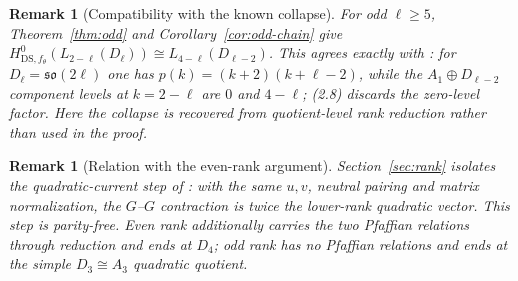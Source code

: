 \documentclass[11pt]{article}
\newtheorem{remark}[theorem]{Remark}
\begin{document}
\begin{remark}[Compatibility with the known collapse]
For odd $\ell\ge5$, Theorem~\ref{thm:odd} and
Corollary~\ref{cor:odd-chain} give
$H^0_{\mathrm{DS},f_\theta}(L_{2-\ell}(D_\ell))\cong
L_{4-\ell}(D_{\ell-2})$.  This agrees exactly with
\cite[Theorem~2.3, Table~4, (2.6), and (2.8)]{AKMPP}: for
$D_\ell=\mathfrak{so}(2\ell)$ one has
$p(k)=(k+2)(k+\ell-2)$, while the $A_1\oplus D_{\ell-2}$ component
levels at $k=2-\ell$ are $0$ and $4-\ell$; (2.8) discards the zero-level
factor.  Here the collapse is recovered from quotient-level rank reduction
rather than used in the proof.
\end{remark}

\begin{remark}[Relation with the even-rank argument]
Section~\ref{sec:rank} isolates the quadratic-current step of
\cite[\S8.3]{JinAM}: with the same $u,v$, neutral pairing and matrix
normalization, the $G$--$G$ contraction is twice the lower-rank quadratic
vector.  This step is parity-free.  Even rank additionally carries the two
Pfaffian relations through reduction \cite[\S8.2]{JinAM} and ends at $D_4$;
odd rank has no Pfaffian relations and ends at the simple $D_3\cong A_3$
quadratic quotient.
\end{remark}
\end{document}
